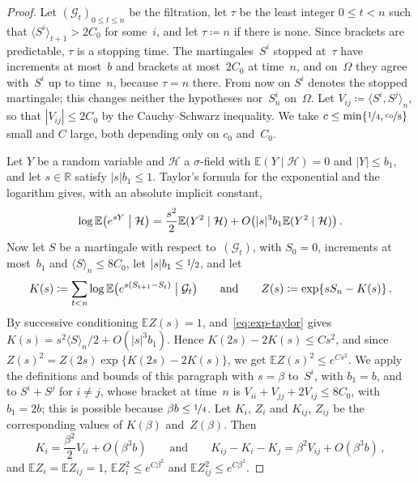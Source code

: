\documentclass[11pt]{amsart}
\theoremstyle{plain}
\theoremstyle{definition}
\newcommand{\R}{\mathbb R}
\newcommand{\E}{\mathbb E}
\newcommand{\nf}{\nicefrac}
\numberwithin{equation}{section}
\begin{document}
\begin{proof}
Let $(\mathcal G_t)_{0\leq t\leq n}$ be the filtration, let $\tau$ be the least integer $0\leq t<n$ such that $\langle S^i\rangle_{t+1}>2C_0$ for some~$i$, and let $\tau\coloneqq n$ if there is none. Since brackets are predictable, $\tau$ is a stopping time. The martingales~$S^i$ stopped at~$\tau$ have increments at most~$b$ and brackets at most~$2C_0$ at time~$n$, and on~$\Omega$ they agree with~$S^i$ up to time~$n$, because $\tau=n$ there. From now on $S^i$ denotes the stopped martingale; this changes neither the hypotheses nor~$S^i_n$ on~$\Omega$. Let $V_{ij}\coloneqq\langle S^i,S^j\rangle_n$, so that $|V_{ij}|\leq2C_0$ by the Cauchy--Schwarz inequality. We take $c\leq\min\{\nf14,\nf{c_0}8\}$ small and $C$ large, both depending only on $c_0$ and~$C_0$.

Let $Y$ be a random variable and $\mathcal H$ a $\sigma$-field with $\E(Y\mid\mathcal H)=0$ and $|Y|\leq b_1$, and let $s\in\R$ satisfy $|s|b_1\leq1$. Taylor's formula for the exponential and the logarithm gives, with an absolute implicit constant,
\begin{equation}\label{eq:exp-taylor}
\log\E\bigl(e^{sY}\bigm|\mathcal H\bigr)=\frac{s^2}2\E(Y^2\mid\mathcal H)+O\bigl(|s|^3b_1\E(Y^2\mid\mathcal H)\bigr)\, .
\end{equation}
Now let $S$ be a martingale with respect to~$(\mathcal G_t)$, with $S_0=0$, increments at most~$b_1$ and $\langle S\rangle_n\leq8C_0$, let $|s|b_1\leq\nf12$, and let
\begin{equation*}
K(s)\coloneqq\sum_{t<n}\log\E\bigl(e^{s(S_{t+1}-S_t)}\bigm|\mathcal G_t\bigr)
\qquad\text{and}\qquad
Z(s)\coloneqq\exp\{sS_n-K(s)\}\, .
\end{equation*}
By successive conditioning $\E Z(s)=1$, and~\eqref{eq:exp-taylor} gives $K(s)=s^2\langle S\rangle_n/2+O(|s|^3b_1)$. Hence $K(2s)-2K(s)\leq Cs^2$, and since $Z(s)^2=Z(2s)\exp\{K(2s)-2K(s)\}$, we get $\E Z(s)^2\leq e^{Cs^2}$. We apply the definitions and bounds of this paragraph with $s=\beta$ to~$S^i$, with $b_1=b$, and to $S^i+S^j$ for $i\neq j$, whose bracket at time~$n$ is $V_{ii}+V_{jj}+2V_{ij}\leq8C_0$, with $b_1=2b$; this is possible because $\beta b\leq\nf14$. Let $K_i$, $Z_i$ and $K_{ij}$, $Z_{ij}$ be the corresponding values of $K(\beta)$ and~$Z(\beta)$. Then
\begin{equation}\label{eq:exp-moments}
K_i=\frac{\beta^2}2V_{ii}+O(\beta^3b)
\qquad\text{and}\qquad
K_{ij}-K_i-K_j=\beta^2V_{ij}+O(\beta^3b)\, ,
\end{equation}
and $\E Z_i=\E Z_{ij}=1$, $\E Z_i^2\leq e^{C\beta^2}$ and $\E Z_{ij}^2\leq e^{C\beta^2}$.


\end{proof}
\end{document}
